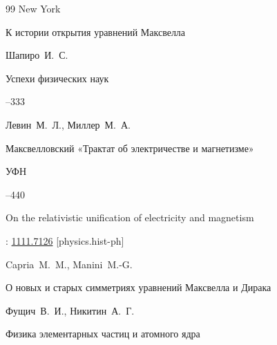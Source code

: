 \begin{thebibliography}{99}
\publaddr New York 




\paper К истории открытия уравнений Максвелла

\by Шапиро~И.~С.

\jour Успехи физических наук




--333







\by Левин~М.~Л., Миллер~М.~А.

\paper Максвелловский «Трактат об электричестве и магнетизме»

\jour УФН 



–440 








\eprint On the relativistic unification of electricity and magnetism 

\arxiv: \href{http://arxiv.org/abs/1111.7126}{1111.7126} [physics.hist-ph]



\by Capria~M.~M., Manini~M.-G.






\paper О новых и старых симметриях уравнений Максвелла и Дирака

\by Фущич~В.~И., Никитин~А.~Г.

\jour Физика элементарных частиц и атомного ядра


\end{thebibliography}
